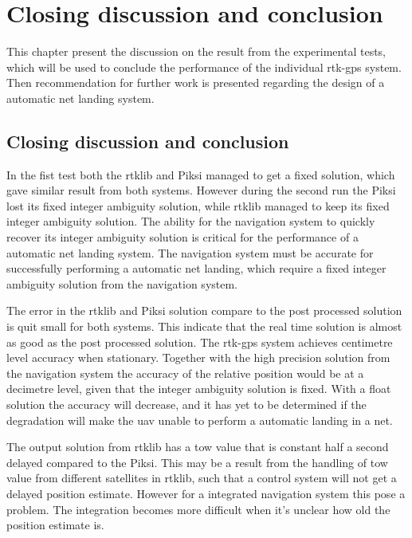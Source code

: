 
\chapter{Closing discussion and conclusion}
This chapter present the discussion on the result from the experimental tests, which will be used to conclude the performance of the individual \gls{rtk-gps} system. Then recommendation for further work is presented regarding the design of a automatic net landing system.
\section{Closing discussion and conclusion}
In the fist test both the \gls{rtklib} and Piksi managed to get a fixed solution, which gave similar result from both systems. However during the second run the Piksi lost its fixed integer ambiguity solution, while \gls{rtklib} managed to keep its fixed integer ambiguity solution. The ability for the navigation system to quickly recover its integer ambiguity solution is critical for the performance of a automatic net landing system. The navigation system must be accurate  for successfully performing a automatic net landing, which require a fixed integer ambiguity solution from the navigation system.

The error in the \gls{rtklib} and Piksi solution compare to the post processed solution is quit small for both systems. This indicate that the real time solution is almost as good as the post processed solution.
The \gls{rtk-gps} system achieves centimetre level accuracy when stationary. Together with the high precision solution from the navigation system the accuracy of the relative position would be at a decimetre level, given that the integer ambiguity solution is fixed. With a float solution the accuracy will decrease, and it has yet to be determined if the degradation will make the \gls{uav} unable to perform a automatic landing in a net.

The output solution from \gls{rtklib} has a \acrfull{tow} value that is constant half a second delayed compared to the Piksi. This may be a result from the handling of \gls{tow} value from different satellites in \gls{rtklib}, such that a control system will not get a delayed position estimate. However for a integrated navigation system this pose a problem. The integration becomes more difficult when it's unclear how old the position estimate is.

